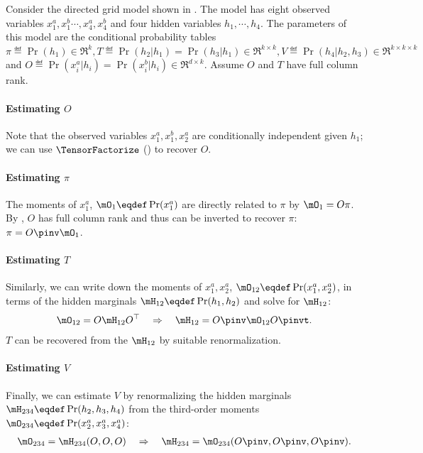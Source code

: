 Consider the directed grid model shown in .
The model has eight observed variables $x^a_1, x^b_1 \cdots, x^a_4, x^b_4$ and four
  hidden variables $h_1, \cdots, h_4$.
The parameters of this model are the conditional probability tables
$\pi \eqdef \Pr(h_1) \in \Re^k, T \eqdef \Pr(h_2 | h_1) = \Pr(h_3 | h_1) \in \Re^{k \times k},
V \eqdef \Pr(h_4 | h_2, h_3) \in \Re^{k \times k \times k}$ and $O \eqdef \Pr(x^a_i | h_i)
=  \Pr(x^b_i | h_i) \in \Re^{d \times k}$. 
Assume $O$ and $T$ have full column rank.

\paragraph{Estimating $O$}
Note that the observed variables $x^a_1, x^b_1, x^a_2$ are
  conditionally independent given $h_1$; we can use
  $\TensorFactorize$ () to recover $O$.

\paragraph{Estimating $\pi$}
The moments of $x^a_1$, $\mO_1 \eqdef \Pr(x^a_1)$ are directly related to
  $\pi$ by $\mO_1 = O \pi$. 
By , $O$ has full column rank and thus can be
  inverted to recover $\pi$: $\pi = O\pinv  \mO_1$.

\paragraph{Estimating $T$}
Similarly, we can write down the moments of $x^a_1, x^a_2$, $\mO_{12}
  \eqdef \Pr(x^a_1, x^a_2)$, in terms of the hidden marginals $\mH_{12}
  \eqdef \Pr(h_1, h_2)$ and solve for $\mH_{12}$:
\begin{align*}
\mO_{12} = O \mH_{12} O^\top \quad\Rightarrow\quad
  \mH_{12} = O\pinv  \mO_{12} O\pinvt .
\end{align*}
$T$ can be recovered from the $\mH_{12}$ by suitable renormalization.

\paragraph{Estimating $V$}
Finally, we can estimate $V$ by renormalizing the hidden marginals
$\mH_{234} \eqdef \Pr(h_2, h_3, h_4)$ from the third-order moments
$\mO_{234} \eqdef \Pr(x^a_2, x^a_3, x^a_4)$:
\begin{align*}
  \mO_{234} = \mH_{234}(O, O, O) \quad\Rightarrow\quad
  \mH_{234} = \mO_{234}(O\pinv , O\pinv , O\pinv ).
\end{align*}

